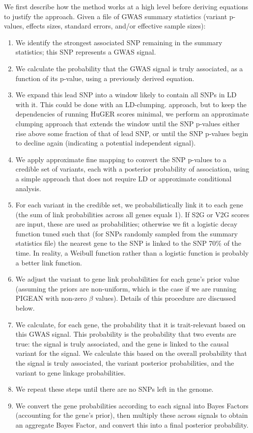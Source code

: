 \documentclass[11pt]{article}
\begin{document}
We first describe how the method works at a high level before deriving
equations to justify the approach. Given a file of GWAS summary
statistics (variant p-values, effects sizes, standard errors, and/or
effective sample sizes):
\begin{enumerate}
  \item We identify the strongest associated SNP remaining in the
    summary statistics; this SNP represents a GWAS signal.
  \item We calculate the probability that the GWAS signal is truly
    associated, as a function of its p-value, using a previously
    derived equation\cite{Wakefield}.
  \item We expand this lead SNP into a window likely to contain all SNPs in
    LD with it. This could be done with an LD-clumping.
    approach\cite{}, but to keep the dependencies of running HuGER
    scores minimal, we perform an approximate clumping approach that
    extends the window until the SNP p-values either rise above some fraction
    of that of lead SNP, or until the SNP p-values begin to decline
    again (indicating a potential independent signal).
  \item We apply approximate fine mapping to convert the SNP p-values
    to a credible set of variants, each with a posterior probability of association\cite{}, using a simple
    approach that does not require LD or approximate conditional
    analysis.
    \item For each variant in the credible set, we probabilistically
      link it to each gene (the sum of link probabilities across all
      genes equals 1). If S2G\cite{} or V2G\cite{} scores are input,
      these are used as probabilities; otherwise we fit a logistic
      decay function tuned such that (for SNPs randomly sampled from
      the summary statistics file) the nearest gene to the SNP is
      linked to the SNP 70\% of the time. In reality, a Weibull
      function rather than a logistic function is probably a better
      link function.
  \item We adjust the variant to gene link probabilities for each
    gene's prior value (assuming the priors are non-uniform, which is
    the case if we are running PIGEAN with non-zero $\beta$
    values). Details of this procedure are discussed below.
  \item We calculate, for each gene, the probability that it is
    trait-relevant based on this GWAS signal. This probability is the
    probability that two events are true: the signal is truly
    associated, and the gene is linked to the causal variant for the
    signal. We calculate this based on the overall probability that
    the signal is truly associated, the
    variant posterior probabilities, and the variant to gene linkage
    probabilities.
  \item We repeat these steps until there are no SNPs left in the
    genome.
  \item We convert the gene probabilities according to each signal
    into Bayes Factors (accounting for the gene's prior), then
    multiply these across signals to obtain an aggregate Bayes Factor,
    and convert this into a final posterior probability.
\end{enumerate}
\end{document}

